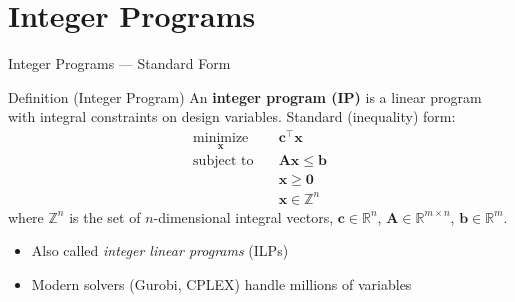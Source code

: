 \documentclass[aspectratio=169,10pt]{beamer}
\newcommand{\bx}{\mathbf{x}}
\newcommand{\bc}{\mathbf{c}}
\newcommand{\bb}{\mathbf{b}}
\newcommand{\bA}{\mathbf{A}}
\newcommand{\RR}{\mathbb{R}}
\newcommand{\ZZ}{\mathbb{Z}}
\begin{document}
\section{Integer Programs}

\begin{frame}{Integer Programs --- Standard Form}
  \begin{block}{Definition (Integer Program)}
    An \textbf{integer program (IP)} is a linear program with integral
    constraints on design variables.  Standard (inequality) form:
    \begin{equation}
      \begin{aligned}
        \underset{\bx}{\text{minimize}} \quad & \bc^\top \bx \\
        \text{subject to} \quad & \bA\bx \leq \bb \\
                                & \bx \geq \mathbf{0} \\
                                & \bx \in \ZZ^n
      \end{aligned}
      \tag{22.1}
    \end{equation}
    where $\ZZ^n$ is the set of $n$-dimensional integral vectors,
    $\bc \in \RR^n$, $\bA \in \RR^{m \times n}$, $\bb \in \RR^m$.
  \end{block}

  \begin{itemize}
    \item Also called \emph{integer linear programs} (ILPs)
    \item Modern solvers (Gurobi, CPLEX) handle millions of variables
  \end{itemize}
\end{frame}
\end{document}
